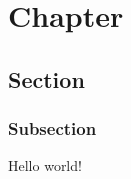 \documentclass[a4paper,spanish,12pt]{report}
\newcommand{\cbp}[3]{}
\begin{document}




  \chapter{Chapter}
  \section{Section}
  \subsection{Subsection}

  Hello world!



  
\end{document}
